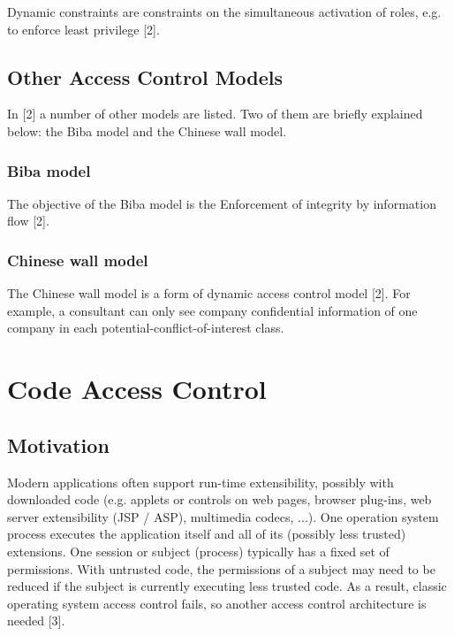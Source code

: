 Dynamic constraints are constraints on the simultaneous activation of roles, e.g. to enforce least privilege [2].



\subsection{Other Access Control Models}

In [2] a number of other models are listed. Two of them are briefly explained below: the Biba model and the Chinese wall model.

\subsubsection{Biba model}

The objective of the Biba model is the Enforcement of integrity by information flow [2].


\subsubsection{Chinese wall model}

The Chinese wall model is a form of dynamic access control model [2]. For example, a consultant can only see company confidential information of one company in each potential-conflict-of-interest class.






\section{Code Access Control}

\subsection{Motivation}

Modern applications often support run-time extensibility, possibly with downloaded code (e.g. applets or controls on web pages, browser plug-ins, web server extensibility (JSP / ASP), multimedia codecs, ...). One operation system process executes the application itself and all of its (possibly less trusted) extensions. One session or subject (process) typically has a fixed set of permissions. With untrusted code, the permissions of a subject may need to be reduced if the subject is currently executing less trusted code. As a result, classic operating system access control fails, so another access control architecture is needed [3].

